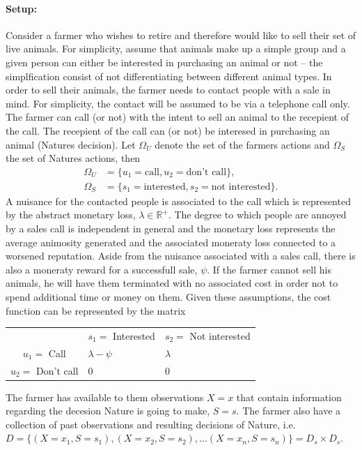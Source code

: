 \begin{example}
\end{example}



\begin{example}
	\paragraph{Setup:} Consider a farmer who wishes to retire and therefore would like to sell their set of live animals. For simplicity, assume that animals make up a simple group and a given person can either be interested in purchasing an animal or not -- the simplfication consist of not differentiating between different animal types. In order to sell their animals, the farmer needs to contact people with a sale in mind. For simplicity, the contact will be assumed to be via a telephone call only. The farmer can call (or not) with the intent to sell an animal to the recepient of the call. The recepient of the call can (or not) be interesed in purchasing an animal (Natures decision). Let $\Omega_U$ denote the set of the farmers actions and $\Omega_S$ the set of Natures actions, then
	\begin{equation}
		\begin{split}
			\Omega_U &= \{u_1 = \text{call}, u_2 = \text{don't call}\},\\
			\Omega_S &= \{s_1 = \text{interested}, s_2 = \text{not interested}\}.
		\end{split}
	\end{equation}
	A nuisance for the contacted people is associated to the call which is represented by the abstract monetary loss, $\lambda\in \mathbb{R}^+$. The degree to which people are annoyed by a sales call is independent in general and the monetary loss represents the average animosity generated and the associated moneraty loss connected to a worsened reputation. Aside from the nuisance associated with a sales call, there is also a moneraty reward for a successfull sale, $\psi$.	If the farmer cannot sell his animals, he will have them terminated with no associated cost in order not to spend additional time or money on them. Given these assumptions, the cost function can be represented by the matrix
	\begin{center}
		\begin{tabular}{  c  c  c }
			& $s_1=$ Interested & $s_2=$ Not interested  \\
			\cline{2-3}
			$u_1 =$ Call& \multicolumn{1}{|l}{$\lambda-\psi$} &\multicolumn{1}{l|}{$\lambda$}  \\
			$u_2=$ Don't call& \multicolumn{1}{|l}{$0$} & \multicolumn{1}{l|}{0} \\
			\cline{2-3}
		\end{tabular}
	\end{center}
	The farmer has available to them observations $X=x$ that contain information regarding the decesion Nature is going to make, $S=s$. The farmer also have a collection of past observations and resulting decisions of Nature, i.e. $D= \{(X=x_1,S=s_1),(X=x_2,S=s_2),\dots (X=x_n,S=s_n)\}= D_s\times D_s$. 
	

\end{example}
